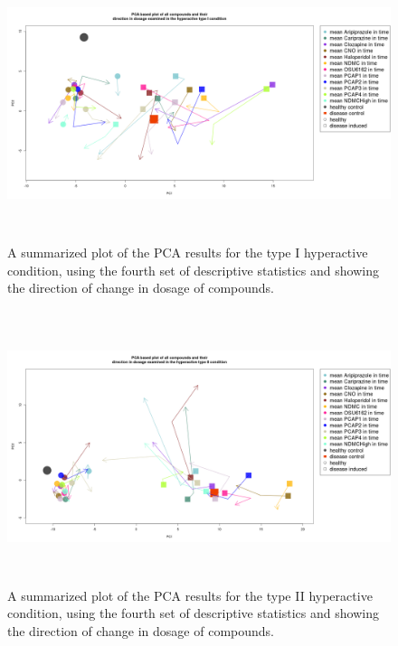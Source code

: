 \documentclass[a4paper,12pt]{article}
\begin{document}
\begin{figure}[h!]
\begin{center}
\includegraphics[width=16cm,height=8cm]{All_together_doses_DarkApoHighset4.png}
\caption{A summarized plot of the PCA results for the type I hyperactive condition, using the fourth set of descriptive statistics and showing the direction of change in dosage of compounds.}
\end{center}
\end{figure}
\newpage

\begin{figure}[h!]
\begin{center}
\includegraphics[width=16cm,height=8cm]{All_together_doses_DarkPTZset4.png}
\caption{A summarized plot of the PCA results for the type II hyperactive condition, using the fourth set of descriptive statistics and showing the direction of change in dosage of compounds.}
\end{center}
\end{figure}
\newpage
\end{document}
